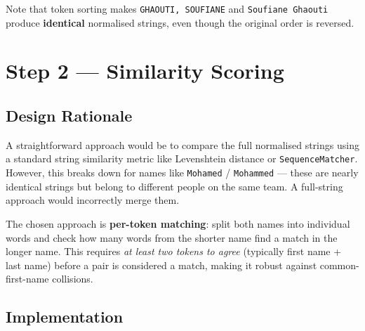 \documentclass[12pt, a4paper]{article}
\begin{document}
\noindent
Note that token sorting makes \texttt{GHAOUTI, SOUFIANE} and \texttt{Soufiane Ghaouti}
produce \textbf{identical} normalised strings, even though the original order is reversed.

\section{Step 2 — Similarity Scoring}

\subsection{Design Rationale}

A straightforward approach would be to compare the full normalised strings using a standard
string similarity metric like Levenshtein distance or \texttt{SequenceMatcher}. However,
this breaks down for names like \texttt{Mohamed} / \texttt{Mohammed} — these are nearly
identical strings but belong to different people on the same team. A full-string approach
would incorrectly merge them.

The chosen approach is \textbf{per-token matching}: split both names into individual words
and check how many words from the shorter name find a match in the longer name. This
requires \textit{at least two tokens to agree} (typically first name + last name) before
a pair is considered a match, making it robust against common-first-name collisions.

\subsection{Implementation}
\end{document}
